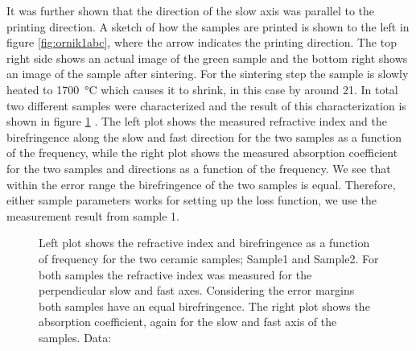 It was further shown that the direction of the slow axis was parallel to the printing direction. A sketch of how the samples are printed is shown to the left in figure \ref{fig:ornik1abc}, where the arrow indicates the printing direction. The top right side shows an actual image of the green sample and the bottom right shows an image of the sample after sintering. For the sintering step the sample is slowly heated to \SI{1700}{\celsius} which causes it to shrink, in this case by around \SI{21}{\volpercent}. In total two different samples were characterized and the result of this characterization is shown in figure \ref{fig:ri_abs} \cite{Ornik2021}. The left plot shows the measured refractive index and the birefringence along the slow and fast direction for the two samples as a function of the frequency, while the right plot shows the measured absorption coefficient for the two samples and directions as a function of the frequency. We see that within the error range the birefringence of the two samples is equal. Therefore, either sample parameters works for setting up the loss function, we use the measurement result from sample 1. 

\begin{figure}[ht]
    \centering
    
    \caption{Left plot shows the refractive index and birefringence as a function of frequency for the two ceramic  samples; Sample1 and Sample2. For both samples the refractive index was measured for the perpendicular slow and fast axes. Considering the error margins both samples have an equal birefringence. The right plot shows the absorption coefficient, again for the slow and fast axis of the samples. Data: \cite{Ornik2021}}
    \label{fig:ri_abs}
\end{figure}

